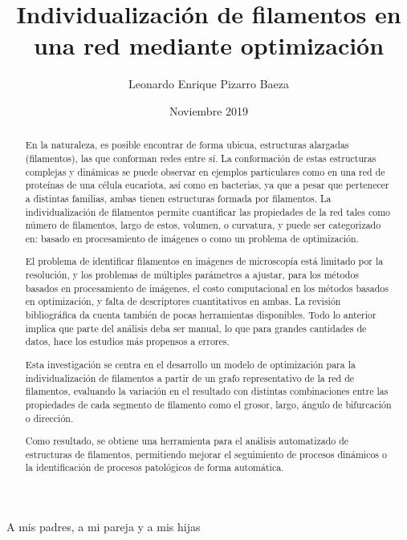 \documentclass[upright, contnum]{umemoria}
\author{Leonardo Enrique Pizarro Baeza}
\title{Individualizaci\'on de filamentos en una red mediante optimizaci\'on}
\date{Noviembre 2019}
\begin{document}
\frontmatter
\maketitle

\begin{abstract}
En la naturaleza, es posible encontrar de forma ubicua, estructuras alargadas (filamentos), las que conforman redes entre s\'i.  La conformaci\'on de estas estructuras complejas y din\'amicas se puede observar en ejemplos
particulares como en una red de prote\'inas de una c\'elula eucariota, as\'i como en bacterias, ya que a pesar que pertenecer a distintas familias, ambas tienen estructuras formada por filamentos. La individualizaci\'on de filamentos permite cuantificar las propiedades de la red tales como n\'umero de filamentos, largo de estos, volumen, o curvatura, y  puede ser categorizado en: basado en procesamiento de im\'agenes o como un problema de optimizaci\'on.

El problema de identificar filamentos en im\'agenes de microscop\'ia est\'a limitado por la resoluci\'on, y los problemas de m\'ultiples par\'ametros a ajustar, para los m\'etodos basados en procesamiento de im\'agenes, el costo
computacional en los m\'etodos basados en optimizaci\'on, y falta de descriptores cuantitativos en ambas. La revisi\'on bibliogr\'afica da cuenta tambi\'en de pocas herramientas disponibles. Todo lo anterior implica que parte del an\'alisis deba ser manual, lo que para grandes cantidades de datos, hace los estudios más propensos a errores.

Esta investigación se centra en el desarrollo un modelo de optimizaci\'on para la individualizaci\'on de filamentos a partir de un grafo representativo de la red de filamentos, evaluando la variaci\'on en el resultado con distintas combinaciones entre las propiedades de cada segmento de filamento como el grosor, largo, \'angulo de bifurcaci\'on o direcci\'on.

Como resultado, se obtiene una herramienta para el an\'alisis automatizado de estructuras de filamentos, permitiendo mejorar el seguimiento de procesos din\'amicos o la identificaci\'on de procesos patol\'ogicos de forma autom\'atica.
\end{abstract}

\begin{dedicatoria} %
A mis padres, a mi pareja y a mis hijas
\end{dedicatoria}
\end{document}

